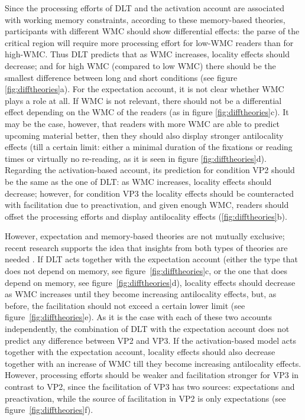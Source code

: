 \documentclass{frontiersSCNS}\usepackage{knitr}
\begin{document}
Since the processing efforts of DLT and the activation account are associated with working memory constraints, according to these memory-based theories,  participants with different WMC should show differential effects: the parse of the critical region will require more processing effort for low-WMC readers than for high-WMC. Thus DLT predicts that as WMC increases, locality effects should decrease; and for high WMC (compared to low WMC) there should be the smallest difference between long and short conditions (see figure \ref{fig:difftheories}a). For the expectation account, it is not clear whether WMC plays a role at all. If WMC is not relevant, there should not be a differential effect depending on the WMC of the readers (as in figure \ref{fig:difftheories}c). It may be the case, however, that readers with more WMC are able to predict upcoming material better, then they should also display stronger antilocality effects (till a certain limit: either a minimal duration of the fixations or reading times or virtually no re-reading, as it is seen in figure \ref{fig:difftheories}d). Regarding the activation-based account, its prediction for condition VP2 should be the same as the one of DLT: as WMC increases, locality effects should decrease; however, for condition VP3 the locality effects should be counteracted with facilitation due to preactivation, and given enough WMC, readers should offset the processing efforts and display antilocality effects (\ref{fig:difftheories}b). 






However, expectation and memory-based theories are not mutually exclusive; recent research supports the idea that insights from both types of theories are needed \citep{Staub2010,VasishthDrenhaus2011,LevyKeller2012,LevyEtAl2013,HusainEtAl2014}. If DLT acts together with the expectation account (either the type that does not depend on memory, see figure~\ref{fig:difftheories}c, or the one that does depend on memory, see figure~\ref{fig:difftheories}d), locality effects should decrease as WMC increases until they become increasing antilocality effects, but, as before, the facilitation should not exceed a certain lower limit (see figure~\ref{fig:difftheories}e). As it is the case with each of these two accounts independently, the combination of DLT with the expectation account does not predict any difference between VP2 and VP3. If the activation-based model acts together with the expectation account, locality effects should also decrease together with an increase of WMC till they become increasing antilocality effects. However, processing efforts should be weaker and facilitation stronger for VP3 in contrast to VP2, since the facilitation of VP3 has two sources: expectations and preactivation, while the source of facilitation in VP2 is only expectations (see figure~\ref{fig:difftheories}f).
 
\end{document}
